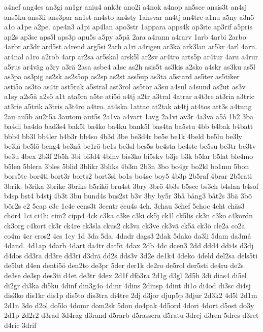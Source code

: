 {{a4nef
ang4es
an3gi
an1gr
aniu4
ank3r
ano2i
a4nok
a4nop
an5sce
ansis3t
an4sj
ans5ku
ans3li
ans3par
an1st
an4sto
an4sty
1ansvar
an4tj
an4tre
a1nu
a5ny
a3n^^f6
a1o
a1pe
a2pe.
ape4n3
a1pi
ap4lan
apo3str
1appara
apps4k
ap3ric
ap3rif
a5pris
ap2s
ap3se
aps5l
aps3p
apu5s
a5py
a5p^^e4
2ara
a4rann
a4rarv
1arb
4arbi
2arbo
4arbr
ar3dr
ard5st
a4rend
arg5si
2arh
a1ri
a4rigen
ar3ka
ark3lan
ar5kr
4arl
4arn.
ar4nal
a1ro
a2rob
4arp
ar2sa
ar5skal
arsk5l
ar2sv
ar4tro
arts5p
ar4tur
4aru
a4rur
a5rus
ar4v^^e4g
a3ry
a3r^^e4
2asa
asbe4
a1sc
as2h
asis5t
as3kis
a2sko
a4skr
as3ku
as5l
as3pa
as3pig
as2sk
as2s5op
as2sp
as2st
ass5up
as3ta
a5stard
as5ter
as5tiker
asti5o
as3to
as4tr
ast5rak
a5stral
ast3rol
as5t^^f6r
a3su
a4sul
a4sund
as2ut
as3v
a1sy
a2s5^^e5
a2s^^f6
a1t
ata5ra
a5te
ati5^^f6
a4tj
a2tr
a3tral
4atrar
a4t3re
at3ria
a3tric
at3rie
a5trik
a3tris
a3t4ro
a4tro.
at4ska
1attac
at2tak
at4tj
at4tos
att3s
a4tung
2au
au5b
au2t5a
3autom
aut5s
2a1va
a4vart
1avg
2a1vi
av3r
4a3v^^e4
a5^^e5
1b2
3ba
ba4di
ba4do
bad3s4
bak5l
ba4ko
ba4ku
bank5l
bas4ta
ba5stu
4bb
b4bak
b4batt
bbb4
bb3l
bb4ler
b4b3r
bb4so
4b3d
3be
be3d4r
be5e
be1k
4beld
be5lu
be3ly
be3l^^e5
be5l^^f6
beng4
be3n^^e5
be1r^^f6
be1s
be3sl
bes5s
be4sta
be4ste
be5su
be3tr
be3tv
be3u
4bex
2b3f
2b5h
3bi
bi3d4
4binv
bis3ko
bi5skv
b3je
b3k
b5lar
b5lat
ble4mo
b5len
5blera
3bles
5blid
3blikr
3bliks
4b3m
2b3n
3bo
bo4gr
bo2kl
bo1mu
5bon
bors5te
bor4ti
bort3r
borts2
bort3sl
bo1s
bo4sc
boy5
4b3p
2b5raf
4brar
2b5rati
3brik.
b3rika
3brike
3briks
b5rik^^f6
bru4st
3bry
3br^^f6
4b3s
b5sce
bs3ch
b4slan
b4sof
b4sp
bst4
b4stj
4b3t
3bu
bund4s
bus2st
b3v
3by
by5r
3b^^e5
b^^e5ng3
b^^e5t2s
3b^^e4
3b^^f6
b^^f6r2s
c2
5cap
c3c
1c4e
cens3t
3centr
ceu4s
4ch.
3chau
3chef
5choc
4cht
ch^^e4s3
ch^^f6r4
1ci
ci4lu
cim2
cipp4
4ck
c3ka
c3ke
c3ki
ck5j
ck1l
ck5lis
ck3n
c3ko
c4kordn
ck3org
c4kort
ck3r
ck4re
ck3sla
ckus2
ck3va
ck3ve
ck3v^^e4
ck5^^e4
ck3^^f6
cle2a
co2a
co4m
4cr
cros2
4cs
1cy
1d
3da
5da.
4dadr
dags3
2dak
5dako
da3li
5dam
da3m^^e5
4dand.
4d1ap
4darb
4dart
da4tr
dat5t
4dax
2db
4dc
dcen3
2dd
ddd4
ddi4s
d3dj
d4dos
dd3ra
dd3re
dd3ri
d3dr^^e4
dd2s
dds3v
3d2e
de1k4
4deko
4deld
del2sa
dels5ti
de5lut
d4en
denti5^^f6
den2to
de3pr
5der
der1k
de2ro
de5rol
der5sti
de4ru
de2s
de3se
de3sp
des3ti
d4et
de3tr
4dex
2d1f
df^^f63ra
2d1g
d3gl
2d5h
3di
dias4
di5el
di2gr
di3ka
di5ku
4dinf
din3g4o
4dinr
4dins
2dinsp
4dint
di1o
di4od
di3sc
di4sj
dis3ko
dis1kr
dis1p
dis5to
dis3tra
di4tre
2dj
d3jor
djup5p
3djur
2d3k2
4d5l
2d1m
2d1n
3do
d2ol
do5lo
4domr
dom2sk
5don
do4pak
4d5ord
4dori
4dort
d5ost
do3y
2d1p
2d2r2
d3rad
3d4rag
d3rand
d5rarb
d5rassera
d5ratu
3drej
d3ren
5dres
d3ret
d4ric
3drif
}}
